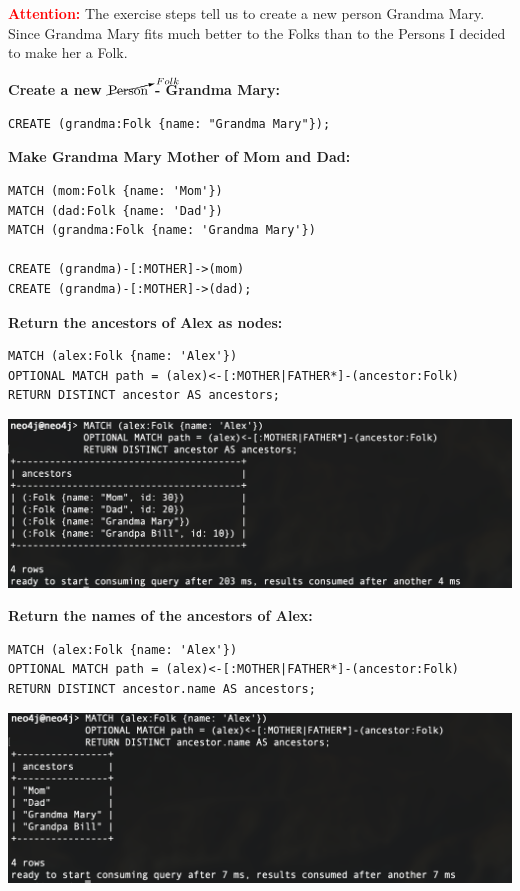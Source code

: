 \documentclass[14pt,a4paper]{extarticle}
\begin{document}
	\vspace{0.5cm}
	\noindent \textcolor{red}{\textbf{Attention:}} The exercise steps tell us to create a new person Grandma Mary.
	Since Grandma Mary fits much better to the Folks than to the Persons I decided to make her a Folk.
	\vspace{0.2cm}

	\noindent \textbf{Create a new $\cancelto{Folk}{\textrm{Person}}$ - Grandma Mary:}
	\begin{lstlisting}[style=sql]
CREATE (grandma:Folk {name: "Grandma Mary"});
	\end{lstlisting}

	\noindent \textbf{Make Grandma Mary Mother of Mom and Dad:}
	\begin{lstlisting}[style=sql]
MATCH (mom:Folk {name: 'Mom'})
MATCH (dad:Folk {name: 'Dad'})
MATCH (grandma:Folk {name: 'Grandma Mary'})

CREATE (grandma)-[:MOTHER]->(mom)
CREATE (grandma)-[:MOTHER]->(dad);
	\end{lstlisting}

	\pagebreak

	\noindent \textbf{Return the ancestors of Alex as nodes:}
	\begin{lstlisting}[style=sql]
MATCH (alex:Folk {name: 'Alex'})
OPTIONAL MATCH path = (alex)<-[:MOTHER|FATHER*]-(ancestor:Folk)
RETURN DISTINCT ancestor AS ancestors;
	\end{lstlisting}
	\includegraphics[width=\textwidth]{images/sc04.png}

	\noindent \textbf{Return the names of the ancestors of Alex:}
	\begin{lstlisting}[style=sql]
MATCH (alex:Folk {name: 'Alex'})
OPTIONAL MATCH path = (alex)<-[:MOTHER|FATHER*]-(ancestor:Folk)
RETURN DISTINCT ancestor.name AS ancestors;
	\end{lstlisting}
	\includegraphics[width=\textwidth]{images/sc05.png}
\end{document}
